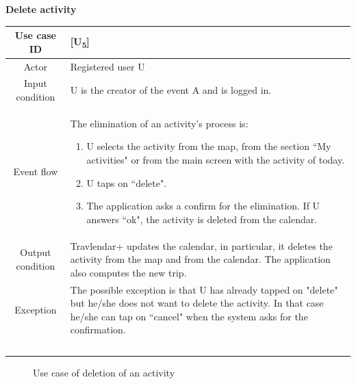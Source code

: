 \documentclass[12pt,titlepage]{article}
\begin{document}
\begin{flushleft}
\textbf{Delete activity}
\end{flushleft}

\begin{tabular}{cp{10cm}} 
Use case ID& {[U\textsubscript{5}]}\\ \hline
Actor&Registered user U \\ \hline 

Input condition&U is the creator of the event A and is logged in.\\ \hline
Event flow&The elimination of an activity's process is: 
\begin{enumerate}
\item U selects the activity from the map, from the section ``My activities" or from the main screen with the activity of today.
\item U taps on ``delete". 
\item The application asks a confirm for the elimination. If U answers ``ok", the activity is deleted from the calendar.
\end{enumerate}\\ \hline
Output condition& Travlendar+ updates the calendar, in particular, it deletes the activity from the map and from the calendar. The application also computes the new trip.
\\ \hline
Exception& The possible exception is that U has already tapped on "delete" but he/she does not want to delete the activity. In that case he/she can tap on ``cancel" when the system asks for the confirmation.
\\ \hline \

\end{tabular}
\pagebreak 
\begin{figure}
\centering
{}
\caption{Use case of deletion of an activity}

\end{figure}
\end{document}
